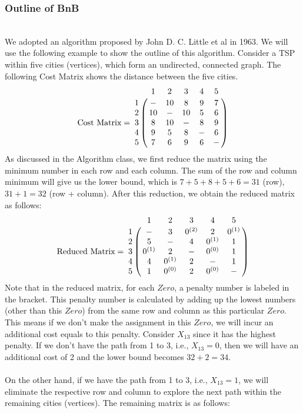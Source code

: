 \subsubsection{Outline of BnB}
\hfill\\
We adopted an algorithm proposed by John D. C. Little et al \cite{Little1963} in 1963. We will use the following example\cite{Bnb-Poth2013} to show the outline of this algorithm. Consider a TSP within five cities (vertices), which form an undirected, connected graph. The following Cost Matrix shows the distance between the five cities. 
$$
\text{Cost Matrix} =  
\bordermatrix{
          & 1 & 2 & 3 & 4 & 5     \cr
    1     & - & 10 & 8 & 9 & 7    \cr
    2     & 10 & - & 10 & 5 & 6   \cr
   	3 	  & 8 & 10 & - & 8 & 9    \cr
    4     & 9 & 5 & 8 & - & 6   \cr   
    5     & 7 & 6 & 9 & 6 & -   \cr
            }
$$
As discussed in the Algorithm class, we first reduce the matrix using the minimum number in each row and each column. The sum of the row and column minimum will give us the lower bound, which is $7+5+8+5+6=31$ (row), $31+1=32$ (row + column). After this reduction, we obtain the reduced matrix as follows:
$$
\text{Reduced Matrix} =  
\bordermatrix{
          & 1 & 2 & 3 & 4 & 5     \cr
    1     & - & 3 & 0^{(2)} & 2 & 0^{(1)}    \cr
    2     & 5 & - & 4 & 0^{(1)} & 1   \cr
   	3 	  & 0^{(1)} & 2 & - & 0^{(0)} & 1    \cr
    4     & 4 & 0^{(1)} & 2 & - & 1   \cr   
    5     & 1 & 0^{(0)} & 2 & 0^{(0)} & -   \cr
            }
$$
Note that in the reduced matrix, for each $Zero$, a penalty number is labeled in the bracket. This penalty number is calculated by adding up the lowest numbers (other than this $Zero$) from the same row and column as this particular $Zero$. This means if we don't make the assignment in this $Zero$, we will incur an additional cost equals to this penalty. Consider $X_{13}$ since it has the highest penalty. If we don't have the path from 1 to 3, i.e., $X_{13}=0$, then we will have an additional cost of 2 and the lower bound becomes $32+2=34$. \\
\\
On the other hand, if we have the path from 1 to 3, i.e., $X_{13}=1$, we will eliminate the respective row and column to explore the next path within the remaining cities (vertices). The remaining matrix is as follows:\\
